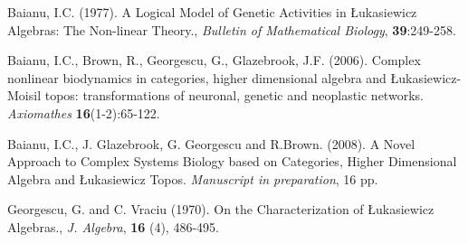 \documentclass[12pt]{article}
\begin{document}
\begin{thebibliography}{9}

Baianu, I.C. (1977). A Logical Model of Genetic Activities in \L{}ukasiewicz Algebras: The
Non-linear Theory., {\em Bulletin of Mathematical Biology}, \textbf{39}:249-258.

Baianu, I.C., Brown, R., Georgescu, G., Glazebrook, J.F. (2006). Complex nonlinear biodynamics in
categories, higher dimensional algebra and \L{}ukasiewicz-Moisil topos: transformations of neuronal,
genetic and neoplastic networks. {\em Axiomathes} \textbf{16}(1-2):65-122.

Baianu, I.C., J. Glazebrook, G. Georgescu and R.Brown. (2008). A Novel Approach to
Complex Systems Biology based on Categories, Higher Dimensional Algebra and \L{}ukasiewicz Topos. 
{\em Manuscript in preparation}, 16 pp.

Georgescu, G. and C. Vraciu (1970). On the Characterization of \L{}ukasiewicz Algebras.,
\emph{J. Algebra}, \textbf{16} (4), 486-495.

\end{thebibliography}
\end{document}
